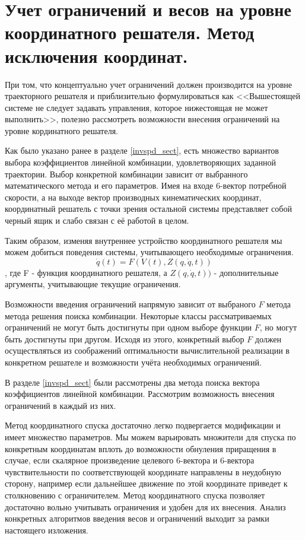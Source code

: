 \section{Учет ограничений и весов на уровне координатного решателя. Метод исключения координат.}

При том, что концептуально учет ограничений должен производится на уровне траекторного решателя и приблизительно формулироваться как <<Вышестоящей системе не следует задавать управления, которое нижестоящая не может выполнить>>, полезно рассмотреть возможности внесения ограничений на уровне кординатного решателя.

Как было указано ранее в разделе \ref{invspd_sect}, есть множество вариантов выбора коэффициентов линейной комбинации, удовлетворяющих заданной траектории. Выбор конкретной комбинации зависит от выбранного математического метода и его параметров. Имея на входе 6-вектор потребной скорости, а на выходе вектор производных кинематических координат, координатный решатель с точки зрения остальной системы представляет собой черный ящик и слабо связан с её работой в целом.

Таким образом, изменяя внутреннее устройство координатного решателя мы можем добиться поведения системы, учитывающего необходимые ограничения.
\begin{equation}
\dot{q}(t) = F(V(t), Z(q,\dot{q},t)) 
\end{equation}, где F - функция координатного решателя, а $Z(q,\dot{q},t))$ - дополнительные аргументы, учитывающие текущие ограничения.   

Возможности введения ограничений напрямую зависит от выбраного $F$ метода метода решения поиска комбинации. Некоторые классы рассматриваемых ограничений не могут быть достигнуты при одном выборе функции $F$, но могут быть достигнуты при другом. Исходя из этого, конкретный выбор $F$ должен осуществляться из соображений оптимальности вычислительной реализации в конкретном решателе и возможности учёта необходимых ограничений.

В разделе \ref{invspd_sect} были рассмотрены два метода поиска вектора коэффициентов линейной комбинации. Рассмотрим возможность внесения ограничений в каждый из них.

Метод координатного спуска достаточно легко подвергается модификации и имеет множество параметров. Мы можем варьировать множители для спуска по конкретным координатам вплоть до возможности обнуления приращения в случае, если скалярное произведение целевого 6-вектора и 6-вектора чувствительности по соответствующей координате направлены в неудобную сторону, например если дальнейшее движение по этой координате приведет к столкновению с ограничителем. Метод координатного спуска позволяет достаточно вольно учитывать ограничения и удобен для их внесения. Анализ конкретных алгоритмов введения весов и ограничений выходит за рамки настоящего изложения. 

